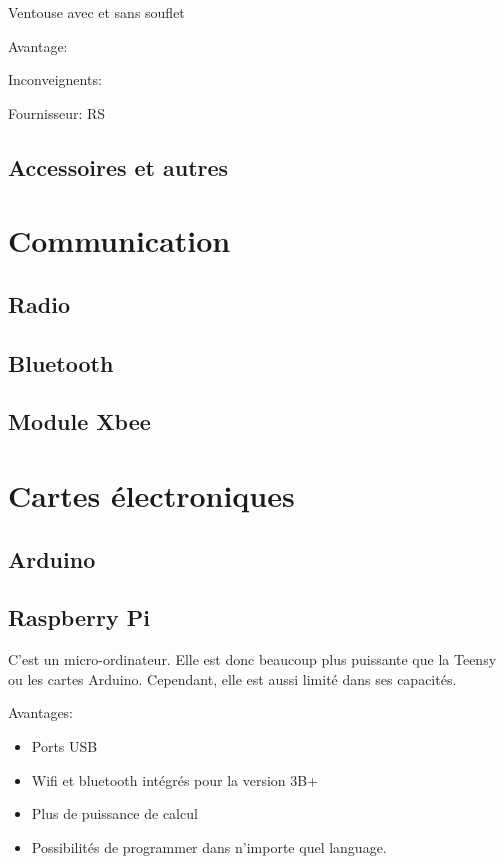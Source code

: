 \documentclass[a4paper, 11pt]{report}
\begin{document}
Ventouse avec et sans souflet

Avantage:

Inconveignents:

Fournisseur: RS

\section{Accessoires et autres}

\chapter{Communication}

\section{Radio}

\section{Bluetooth}

\section{Module Xbee}

\chapter{Cartes électroniques}

\section{Arduino}


\section{Raspberry Pi}
C'est un micro-ordinateur. Elle est donc beaucoup plus puissante que la Teensy ou les cartes Arduino. Cependant, elle est aussi limité dans ses capacités.

Avantages:
\begin{itemize}
\item Ports USB
\item Wifi et bluetooth intégrés pour la version 3B+
\item Plus de puissance de calcul
\item Possibilités de programmer dans n'importe quel language.
\end{itemize}
\end{document}
